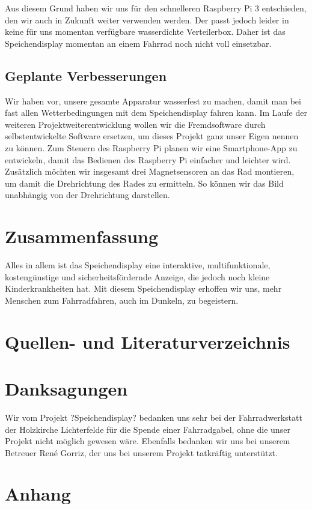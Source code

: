 \documentclass [a4paper, 11pt] {article}
\begin{document}
Aus diesem Grund haben wir uns für den schnelleren Raspberry Pi 3 entschieden, den wir auch in Zukunft weiter verwenden werden. Der passt jedoch leider in keine für uns momentan verfügbare wasserdichte Verteilerbox. Daher ist das Speichendisplay momentan an einem Fahrrad noch nicht voll einsetzbar.
\subsection{Geplante Verbesserungen}
Wir haben vor, unsere gesamte Apparatur wasserfest zu machen, damit man bei fast allen Wetterbedingungen mit dem Speichendisplay fahren kann. Im Laufe der weiteren Projektweiterentwicklung wollen wir die Fremdsoftware durch selbstentwickelte Software ersetzen, um dieses Projekt ganz unser Eigen nennen zu können. Zum Steuern des Raspberry Pi planen wir eine Smartphone-App zu entwickeln, damit das Bedienen des Raspberry Pi einfacher und leichter wird. Zusätzlich möchten wir insgesamt drei Magnetsensoren an das Rad montieren, um damit die Drehrichtung des Rades zu ermitteln. So können wir das Bild unabhängig von der Drehrichtung darstellen.
\section{Zusammenfassung}
Alles in allem ist das Speichendisplay eine interaktive, multifunktionale, kostengünstige und sicherheitsfördernde Anzeige, die jedoch noch kleine Kinderkrankheiten hat. Mit diesem Speichendisplay erhoffen wir uns, mehr Menschen zum Fahrradfahren, auch im Dunkeln, zu begeistern.
\section{Quellen- und Literaturverzeichnis}
\section{Danksagungen}
Wir vom Projekt ?Speichendisplay? bedanken uns sehr bei der Fahrradwerkstatt der Holzkirche Lichterfelde für die Spende einer Fahrradgabel, ohne die unser Projekt nicht möglich gewesen wäre. Ebenfalls bedanken wir uns bei unserem Betreuer René Gorriz, der uns bei unserem Projekt tatkräftig unterstützt.
\section{Anhang}
\end{document}
